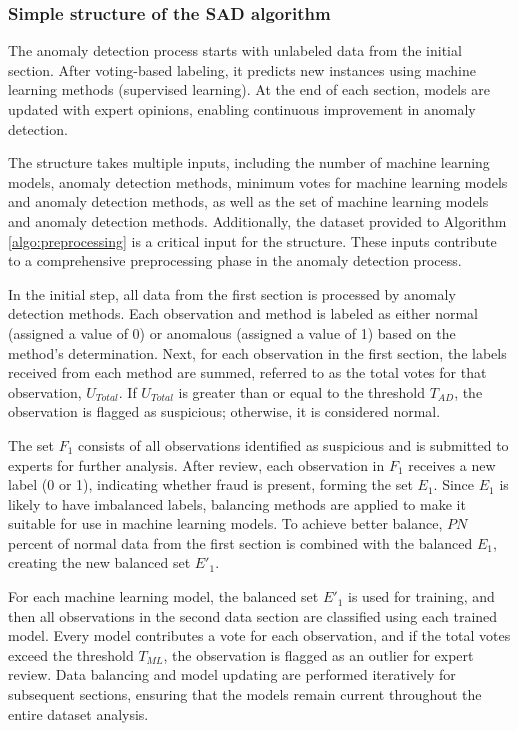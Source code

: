 \documentclass[12pt]{article}
\begin{document}
\subsubsection*{Simple structure of the SAD algorithm}
\label{sec4_2}  The anomaly detection process starts with
unlabeled data from the initial section. After voting-based
labeling, it predicts new instances using machine learning methods
(supervised learning). At the end of each section, models are
updated with expert opinions, enabling continuous improvement in
anomaly detection.

The structure takes multiple inputs, including the number of
machine learning models, anomaly detection methods, minimum votes
for machine learning models and anomaly detection methods, as well
as the set of machine learning models and anomaly detection
methods. Additionally, the dataset provided to Algorithm
\ref{algo:preprocessing} is a critical input for the structure.
These inputs contribute to a comprehensive preprocessing phase in
the anomaly detection process.

In the initial step, all data from the first section is processed
by anomaly detection methods. Each observation and method is
labeled as either normal (assigned a value of 0) or anomalous
(assigned a value of 1) based on the method's determination. Next,
for each observation in the first section, the labels received
from each method are summed, referred to as the total votes for
that observation, $U_{Total}$. If $U_{Total}$ is greater than or
equal to the threshold $T_{AD}$, the observation is flagged as
suspicious; otherwise, it is considered normal.

The set $F_1$ consists of all observations identified as
suspicious and is submitted to experts for further analysis. After
review, each observation in $F_1$ receives a new label (0 or 1),
indicating whether fraud is present, forming the set $E_1$. Since
$E_1$ is likely to have imbalanced labels, balancing methods are
applied to make it suitable for use in machine learning models. To
achieve better balance, $PN$ percent of normal data from the first
section is combined with the balanced $E_1$, creating the new
balanced set $E'_1$.

For each machine learning model, the balanced set $E'_1$ is used
for training, and then all observations in the second data section
are classified using each trained model. Every model contributes a
vote for each observation, and if the total votes exceed the
threshold $T_{ML}$, the observation is flagged as an outlier for
expert review. Data balancing and model updating are performed
iteratively for subsequent sections, ensuring that the models
remain current throughout the entire dataset analysis.
\end{document}
